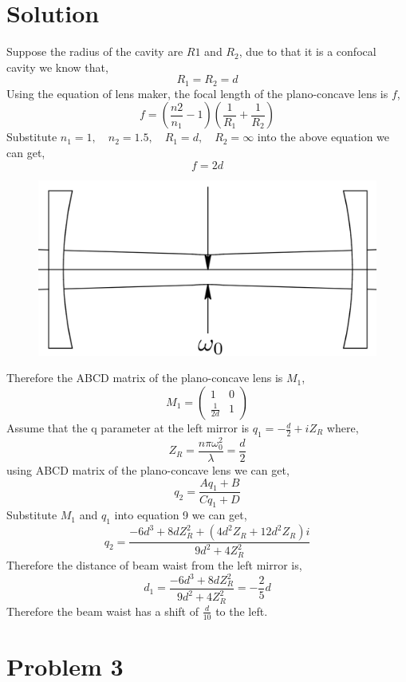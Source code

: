 \documentclass{article}
\begin{document}
\section*{Solution}
Suppose the radius of the cavity are $R1$ and $R_2$, due to that it is a confocal cavity we know that,
\begin{equation}\label{key}
	R_1=R_2=d
\end{equation}
Using the equation of lens maker, the focal length of the plano-concave lens is $f$,
\begin{equation}\label{key}
	f=(\frac{n2}{n_1}-1)(\frac{1}{R_1}+\frac{1}{R_2})
\end{equation}
Substitute $n_1=1, \quad n_2=1.5, \quad R_1=d, \quad R_2=\infty$ into the above equation we can get,
$$f=2d$$
\begin{figure}[h]
	\centering
	\includegraphics[width=0.7\linewidth]{f21}
\end{figure}
Therefore the ABCD matrix of the plano-concave lens is $M_1$,
$$
M_1=
\begin{pmatrix}
1 & 0\\
\frac{1}{2d} & 1
\end{pmatrix}
$$
Assume that the q parameter at the left mirror is $q_1=-\frac{d}{2}+iZ_R$ where,
$$
Z_R=\frac{n\pi\omega_0^2}{\lambda}=\frac{d}{2}
$$
using ABCD matrix of the plano-concave lens we can get,
\begin{equation}\label{key}
	q_2=\frac{Aq_1+B}{Cq_1+D}
\end{equation} 
Substitute $M_1$ and $q_1$ into equation 9 we can get,
\begin{equation}\label{key}
		q_2=\frac{-6d^3+8dZ_R^2+(4d^2Z_R+12d^2Z_R)i}{9d^2+4Z_R^2}
\end{equation}
Therefore the distance of beam waist from the left mirror is,
\begin{equation}\label{key}
	d_1=\frac{-6d^3+8dZ_R^2}{9d^2+4Z_R^2}=-\frac{2}{5}d
\end{equation}
Therefore the beam waist has a shift of $\frac{d}{10}$ to the left.
\section{Problem 3}
\end{document}
